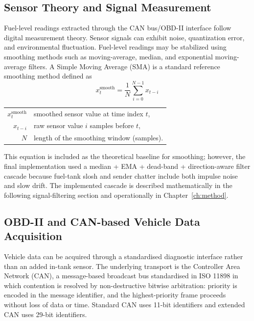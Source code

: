\subsection{Sensor Theory and Signal Measurement}

Fuel-level readings extracted through the CAN bus/OBD-II interface follow digital measurement theory. Sensor signals can exhibit noise, quantization error, and environmental fluctuation. Fuel-level readings may be stabilized using smoothing methods such as moving-average, median, and exponential moving-average filters. A Simple Moving Average (SMA) is a standard reference smoothing method defined as
%
\begin{equation}
x_{t}^{\text{smooth}} = \frac{1}{N} \sum_{i=0}^{N-1} x_{t-i}
\label{eq:sma-ch3}
\end{equation}
\begin{tabular}{@{}r@{~=~}l@{}}
$x_t^{\text{smooth}}$ & smoothed sensor value at time index $t$, \\
$x_{t-i}$ & raw sensor value $i$ samples before $t$, \\
$N$ & length of the smoothing window (samples).
\end{tabular}

\vspace{0.5em}
This equation is included as the theoretical baseline for smoothing; however, the final implementation used a median + EMA + dead-band + direction-aware filter cascade because fuel-tank slosh and sender chatter include both impulse noise and slow drift. The implemented cascade is described mathematically in the following signal-filtering section and operationally in Chapter~\ref{ch:method}.

\subsection{OBD-II and CAN-based Vehicle Data Acquisition}

Vehicle data can be acquired through a standardised diagnostic interface rather than an added in-tank sensor. The underlying transport is the Controller Area Network (CAN), a message-based broadcast bus standardised in ISO 11898 in which contention is resolved by non-destructive bitwise arbitration: priority is encoded in the message identifier, and the highest-priority frame proceeds without loss of data or time. Standard CAN uses 11-bit identifiers and extended CAN uses 29-bit identifiers.

